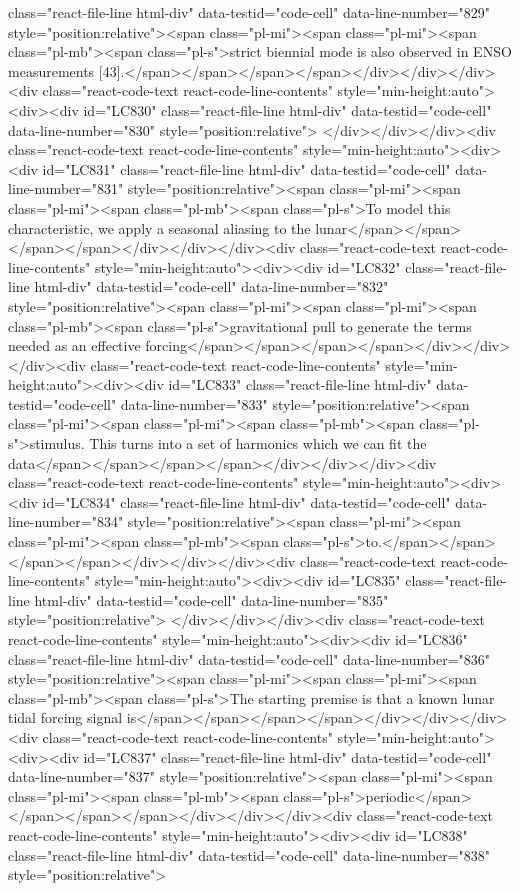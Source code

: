 {{{{{{{{{class="react-file-line html-div" data-testid="code-cell" data-line-number="829" style="position:relative"><span class="pl-mi"><span class="pl-mi"><span class="pl-mb"><span class="pl-s">strict biennial mode is also observed in ENSO measurements {[}43{]}.</span></span></span></span></div></div></div><div class="react-code-text react-code-line-contents" style="min-height:auto"><div><div id="LC830" class="react-file-line html-div" data-testid="code-cell" data-line-number="830" style="position:relative">
</div></div></div><div class="react-code-text react-code-line-contents" style="min-height:auto"><div><div id="LC831" class="react-file-line html-div" data-testid="code-cell" data-line-number="831" style="position:relative"><span class="pl-mi"><span class="pl-mi"><span class="pl-mb"><span class="pl-s">To model this characteristic, we apply a seasonal aliasing to the lunar</span></span></span></span></div></div></div><div class="react-code-text react-code-line-contents" style="min-height:auto"><div><div id="LC832" class="react-file-line html-div" data-testid="code-cell" data-line-number="832" style="position:relative"><span class="pl-mi"><span class="pl-mi"><span class="pl-mb"><span class="pl-s">gravitational pull to generate the terms needed as an effective forcing</span></span></span></span></div></div></div><div class="react-code-text react-code-line-contents" style="min-height:auto"><div><div id="LC833" class="react-file-line html-div" data-testid="code-cell" data-line-number="833" style="position:relative"><span class="pl-mi"><span class="pl-mi"><span class="pl-mb"><span class="pl-s">stimulus. This turns into a set of harmonics which we can fit the data</span></span></span></span></div></div></div><div class="react-code-text react-code-line-contents" style="min-height:auto"><div><div id="LC834" class="react-file-line html-div" data-testid="code-cell" data-line-number="834" style="position:relative"><span class="pl-mi"><span class="pl-mi"><span class="pl-mb"><span class="pl-s">to.</span></span></span></span></div></div></div><div class="react-code-text react-code-line-contents" style="min-height:auto"><div><div id="LC835" class="react-file-line html-div" data-testid="code-cell" data-line-number="835" style="position:relative">
</div></div></div><div class="react-code-text react-code-line-contents" style="min-height:auto"><div><div id="LC836" class="react-file-line html-div" data-testid="code-cell" data-line-number="836" style="position:relative"><span class="pl-mi"><span class="pl-mi"><span class="pl-mb"><span class="pl-s">The starting premise is that a known lunar tidal forcing signal is</span></span></span></span></div></div></div><div class="react-code-text react-code-line-contents" style="min-height:auto"><div><div id="LC837" class="react-file-line html-div" data-testid="code-cell" data-line-number="837" style="position:relative"><span class="pl-mi"><span class="pl-mi"><span class="pl-mb"><span class="pl-s">periodic</span></span></span></span></div></div></div><div class="react-code-text react-code-line-contents" style="min-height:auto"><div><div id="LC838" class="react-file-line html-div" data-testid="code-cell" data-line-number="838" style="position:relative">
}}}}}}}}}
